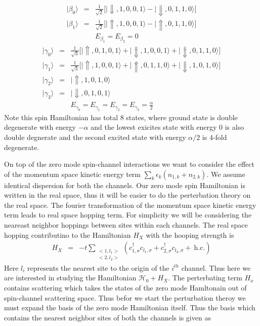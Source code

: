\documentclass[reprint,prb,superscriptaddress]{revtex4-2}
\begin{document}
\begin{eqnarray}
|\beta_0\rangle &=& \frac{1}{\sqrt{2}}\bigg[|\Downarrow,1,0,0,1\rangle-|\Downarrow,0,1,1,0\rangle \bigg] \nonumber\\
|\beta_1\rangle &=& \frac{1}{\sqrt{2}} \bigg[ |\Uparrow,1,0,0,1\rangle-|\Uparrow,0,1,1,0\rangle \bigg]\nonumber\\
&& E_{\beta_1}=E_{\beta_2}=0
\end{eqnarray}
\begin{eqnarray}
|\gamma_{0}\rangle &=&\frac{1}{\sqrt{3}} \bigg[|\Uparrow,0,1,0,1\rangle+|\Downarrow,1,0,0,1\rangle+|\Downarrow,0,1,1,0\rangle \bigg] \nonumber\\
|\gamma_{1}\rangle &=& \frac{1}{\sqrt{3}}\bigg[ |\Uparrow,1,0,0,1\rangle+|\Uparrow,0,1,1,0\rangle+|\Downarrow,1,0,1,0\rangle \bigg] \nonumber\\
|\gamma_{2}\rangle &=& |\Uparrow,1,0,1,0\rangle \nonumber\\
|\gamma_{3}\rangle &=& |\Downarrow,0,1,0,1\rangle \\
&& E_{\gamma_0}=E_{\gamma_1}=E_{\gamma_2}=E_{\gamma_3}=\frac{\alpha}{2}
\end{eqnarray}
Note this spin Hamiltonian has total $8$ states, where ground state is double degenerate with energy $-\alpha$ and the lowest exicites state with energy $0$ is also double degnerate and the second excited state with energy $\alpha/2$ is 4-fold degenerate. 
\par On top of the zero mode spin-channel interactions we want to consider the effect of the momentum space kinetic energy term $\sum_{k}\epsilon_k (n_{1,k}+n_{2,k})$. We assume identical dispersion for both the channels. Our zero mode spin Hamiltonian is written in the real space, thus it will be easier to do the perterbation theory on the real space. The fourier transformation of the momentum space kinetic energy  term leads to real space hopping term. For simplicity we will be considering the neareast neighbor hoppings between sites within each channels. The real space hopping contributino to the Hamiltonian $H_X$ with the hooping strength is 
\begin{eqnarray}
H_{X} &=& -t \displaystyle\sum_{\substack{<1,l_1> \\ <2,l_2>}} (c^{\dagger}_{1,\sigma}c_{l_1,\sigma}+c^{\dagger}_{2,\sigma}c_{l_2,\sigma}+ ~\textrm{h.c.})
\end{eqnarray}
Here $l_i$ represents the nearest site to the origin of the $i^{th}$ channel. Thus here we are interested in studying the Hamiltonian $\mathcal{H}_0+H_X$. The perterbating term $H_x$ contains scattering which takes the states of the zero mode Hamltonain out of spin-channel scattering space. Thus befor we start the perturbation theroy we must expand the basis of the zero mode Hamiltonian itself. Thus the basis which contains the nearest neighbor sites of both the channels is given as 
\end{document}
